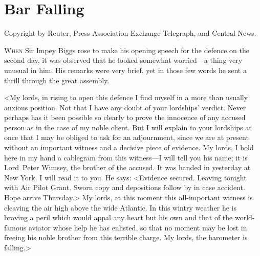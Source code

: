 
\chapter{Bar Falling}

\epigraph{Copyright by Reuter, Press Association Exchange Telegraph, and Central News.}{}


\lettrine{W}{hen} Sir Impey Biggs rose to make his opening speech for the defence on the second day, it was observed that he looked somewhat worried—a thing very unusual in him. His remarks were very brief, yet in those few words he sent a thrill through the great assembly.

<My lords, in rising to open this defence I find myself in a more than usually anxious position. Not that I have any doubt of your lordships' verdict. Never perhaps has it been possible so clearly to prove the innocence of any accused person as in the case of my noble client. But I will explain to your lordships at once that I may be obliged to ask for an adjournment, since we are at present without an important witness and a decisive piece of evidence. My lords, I hold here in my hand a cablegram from this witness—I will tell you his name; it is Lord~Peter Wimsey, the brother of the accused. It was handed in yesterday at New York. I will read it to you. He says: <Evidence secured. Leaving tonight with Air Pilot Grant. Sworn copy and depositions follow by   in case accident. Hope arrive Thursday.> My lords, at this moment this all-important witness is cleaving the air high above the wide Atlantic. In this wintry weather he is braving a peril which would appal any heart but his own and that of the world-famous aviator whose help he has enlisted, so that no moment may be lost in freeing his noble brother from this terrible charge. My lords, the barometer is falling.>

